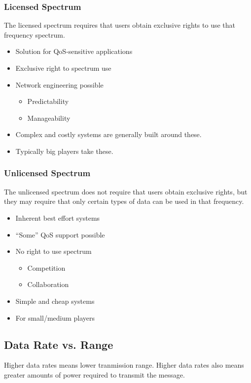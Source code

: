 \subsubsection{Licensed Spectrum}\label{subsubsec:Licensed_Spectrum}
The licensed spectrum requires that users obtain exclusive rights to use that frequency spectrum.
\begin{itemize}[noitemsep]
\item Solution for QoS-sensitive applications
\item Exclusive right to spectrum use
\item Network engineering possible
  \begin{itemize}[noitemsep]
  \item Predictability
  \item Manageability
  \end{itemize}

\item Complex and costly systems are generally built around these.
\item Typically big players take these.
\end{itemize}

\subsubsection{Unlicensed Spectrum}\label{subsubsec:Unlicensed_Spectrum}
The unlicensed spectrum does not require that users obtain exclusive rights, but they may require that only certain types of data can be used in that frequency.
\begin{itemize}[noitemsep]
\item Inherent best effort systems
\item ``Some'' QoS support possible
\item No right to use spectrum
  \begin{itemize}[noitemsep]
  \item Competition
  \item Collaboration
  \end{itemize}

\item Simple and cheap systems
\item For small/medium players
\end{itemize}

\subsection{Data Rate vs. Range}\label{subsec:Data_Rate_vs_Range}
Higher data rates means lower tranmission range.
Higher data rates also means greater amounts of power required to transmit the message.

